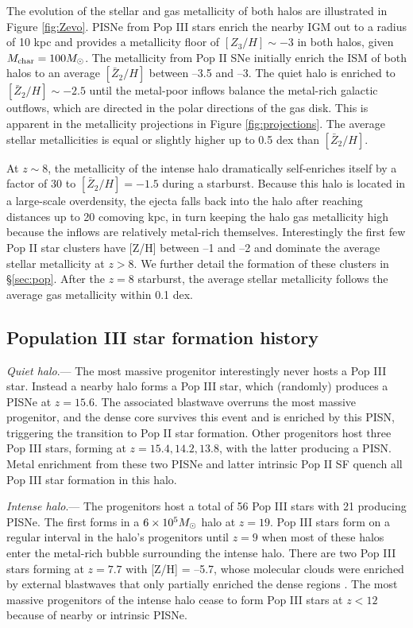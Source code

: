 \documentclass[apjl]{emulateapj}
\begin{document}
The evolution of the stellar and gas metallicity of both halos are
illustrated in Figure \ref{fig:Zevo}.  PISNe from Pop III stars enrich
the nearby IGM out to a radius of 10 kpc and provides a metallicity
floor of $[Z_3/H] \sim -3$ in both halos, given $M_{\rm char} = 100
\Ms$.  The metallicity from Pop II SNe initially enrich the ISM of
both halos to an average $[\bar{Z}_2/H]$ between --3.5 and --3.  The
quiet halo is enriched to $[\bar{Z}_2/H] \sim -2.5$ until the
metal-poor inflows balance the metal-rich galactic outflows, which are
directed in the polar directions of the gas disk.  This is apparent in
the metallicity projections in Figure \ref{fig:projections}.  The
average stellar metallicities is equal or slightly higher up to 0.5
dex than $[\bar{Z}_2/H]$.

At $z \sim 8$, the metallicity of the intense halo dramatically
self-enriches itself by a factor of 30 to $[\bar{Z}_2/H] = -1.5$
during a starburst.  Because this halo is located in a large-scale
overdensity, the ejecta falls back into the halo after reaching
distances up to 20 comoving kpc, in turn keeping the halo gas
metallicity high because the inflows are relatively metal-rich
themselves.  Interestingly the first few Pop II star clusters have
[Z/H] between --1 and --2 and dominate the average stellar metallicity
at $z > 8$.  We further detail the formation of these clusters in
\S\ref{sec:pop}.  After the $z=8$ starburst, the average stellar
metallicity follows the average gas metallicity within 0.1 dex.

\subsection{Population III star formation history}

\textit{Quiet halo}.--- The most massive progenitor interestingly
never hosts a Pop III star.  Instead a nearby halo forms a Pop III
star, which (randomly) produces a PISNe at $z=15.6$.  The associated
blastwave overruns the most massive progenitor, and the dense core
survives this event and is enriched by this PISN, triggering the
transition to Pop II star formation.  Other progenitors host three Pop
III stars, forming at $z = 15.4, 14.2, 13.8$, with the latter
producing a PISN.  Metal enrichment from these two PISNe and latter
intrinsic Pop II SF quench all Pop III star formation in this halo.

\textit{Intense halo}.--- The progenitors host a total of 56 Pop III
stars with 21 producing PISNe.  The first forms in a $6 \times 10^5
\Ms$ halo at $z=19$.  Pop III stars form on a regular interval in the
halo's progenitors until $z=9$ when most of these halos enter the
metal-rich bubble surrounding the intense halo.  There are two Pop III
stars forming at $z=7.7$ with [Z/H] = --5.7, whose molecular clouds
were enriched by external blastwaves that only partially enriched the
dense regions \citep{Cen08}.  The most massive progenitors of the
intense halo cease to form Pop III stars at $z<12$ because of nearby
or intrinsic PISNe.
\end{document}
